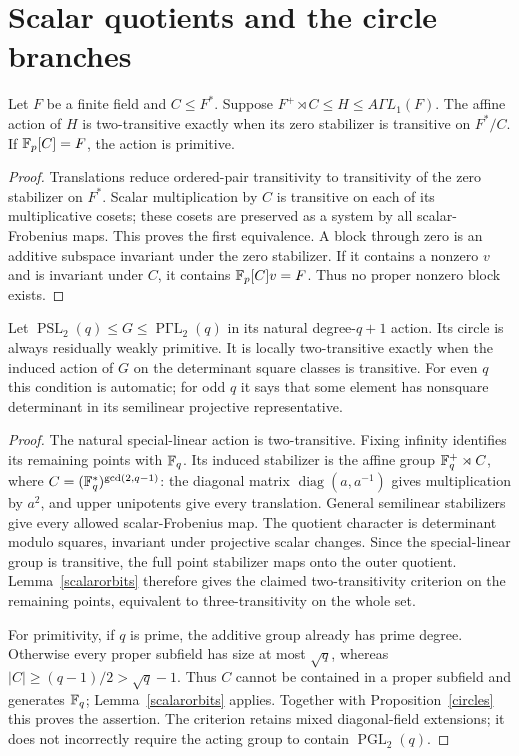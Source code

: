 \section{Scalar quotients and the circle branches}
\begin{lemma}\label{scalarorbits}
Let $F$ be a finite field and $C\le F^*$. Suppose
$F^+\rtimes C\le H\le A\Gamma L_1(F)$. The affine action of $H$
is two-transitive exactly when its zero stabilizer is transitive on
$F^*/C$. If $\mathbb F_p[C]=F$, the action is primitive.
\end{lemma}
\begin{proof}
Translations reduce ordered-pair transitivity to transitivity of the zero
stabilizer on $F^*$. Scalar multiplication by $C$ is transitive on each
of its multiplicative cosets; these cosets are preserved as a system by
all scalar-Frobenius maps. This proves the first equivalence. A block
through zero is an additive subspace invariant under the zero stabilizer.
If it contains a nonzero $v$ and is invariant under $C$, it contains
$\mathbb F_p[C]v=F$. Thus no proper nonzero block exists.
\end{proof}

\begin{proposition}\label{projectiveline}
Let $\operatorname{PSL}_2(q)\le G\le\operatorname{P\Gamma L}_2(q)$
in its natural degree-$q+1$ action. Its circle is always residually
weakly primitive. It is locally two-transitive exactly when the induced
action of $G$ on the determinant square classes is transitive. For even
$q$ this condition is automatic; for odd $q$ it says that some element
has nonsquare determinant in its semilinear projective representative.
\end{proposition}
\begin{proof}
The natural special-linear action is two-transitive. Fixing infinity
identifies its remaining points with $\mathbb F_q$. Its induced stabilizer
is the affine group $\mathbb F_q^+\rtimes C$, where
$C=(\mathbb F_q^*)^{\gcd(2,q-1)}$: the diagonal matrix
$\operatorname{diag}(a,a^{-1})$ gives multiplication by $a^2$,
and upper unipotents give every translation. General semilinear
stabilizers give every allowed scalar-Frobenius map. The quotient
character is determinant modulo squares, invariant under projective
scalar changes. Since the special-linear group is transitive, the full
point stabilizer maps onto the outer quotient. Lemma~\ref{scalarorbits}
therefore gives the claimed two-transitivity criterion on the remaining
points, equivalent to three-transitivity on the whole set.

For primitivity, if $q$ is prime, the additive group already has prime
degree. Otherwise every proper subfield has size at most $\sqrt q$,
whereas $|C|\ge(q-1)/2>\sqrt q-1$. Thus $C$ cannot be contained in a
proper subfield and generates $\mathbb F_q$; Lemma~\ref{scalarorbits} applies.
Together with Proposition~\ref{circles} this proves the assertion.
The criterion retains mixed diagonal-field extensions; it does not
incorrectly require the acting group to contain $\operatorname{PGL}_2(q)$.
\end{proof}

